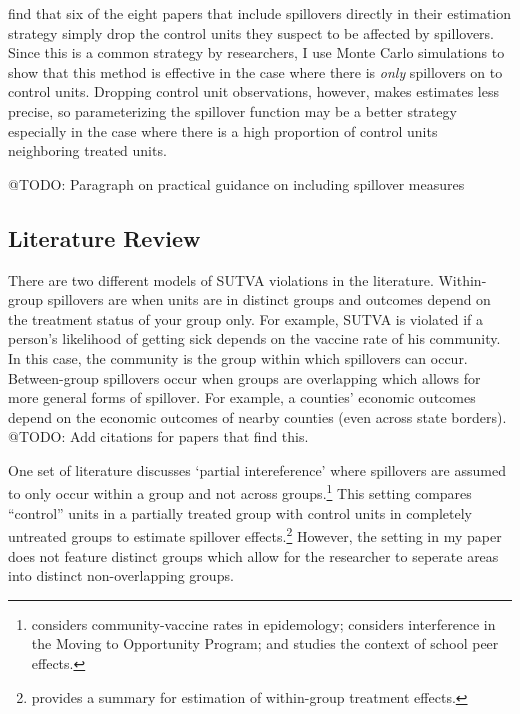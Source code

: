 \documentclass[11pt]{article}
\begin{document}
\citet{Berg_Streitz_2019} find that six of the eight papers that include spillovers directly in their estimation strategy simply drop the control units they suspect to be affected by spillovers. Since this is a common strategy by researchers, I use Monte Carlo simulations to show that this method is effective in the case where there is \textit{only} spillovers on to control units. Dropping control unit observations, however, makes estimates less precise, so parameterizing the spillover function may be a better strategy especially in the case where there is a high proportion of control units neighboring treated units. 

@TODO: Paragraph on practical guidance on including spillover measures


\subsection{Literature Review}

There are two different models of SUTVA violations in the literature. Within-group spillovers are when units are in distinct groups and outcomes depend on the treatment status of your group only. For example, SUTVA is violated if a person's likelihood of getting sick depends on the vaccine rate of his community. In this case, the community is the group within which spillovers can occur. Between-group spillovers occur when groups are overlapping which allows for more general forms of spillover. For example, a counties' economic outcomes depend on the economic outcomes of nearby counties (even across state borders). @TODO: Add citations for papers that find this.

One set of literature discusses `partial intereference' where spillovers are assumed to only occur within a group and not across groups.\footnote{\citet{Halloran_Struchiner_1995} considers community-vaccine rates in epidemology; \citet{Sobel_2006} considers interference in the Moving to Opportunity Program; and \citet{Angrist_2014} studies the context of school peer effects.} This setting compares ``control'' units in a partially treated group with control units in completely untreated groups to estimate spillover effects.\footnote{\citet{Angelucci_DiMaro_2016} provides a summary for estimation of within-group treatment effects.} However, the setting in my paper does not feature distinct groups which allow for the researcher to seperate areas into distinct non-overlapping groups.
\end{document}

